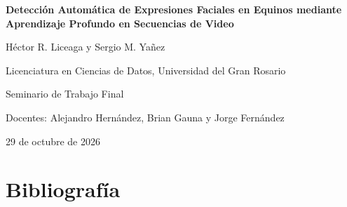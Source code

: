 \documentclass[12pt,a4paper,oneside]{report}
\begin{document}
\RaggedRight

\thispagestyle{fancy}
\begin{center}
  \vspace*{3cm}
  {\bfseries Detección Automática de Expresiones Faciales en Equinos mediante Aprendizaje Profundo en Secuencias de Video\par}
  \vspace{1.5cm}
  Héctor R. Liceaga y Sergio M. Yañez\par
  \vspace{1cm}
  Licenciatura en Ciencias de Datos, Universidad del Gran Rosario\par
  Seminario de Trabajo Final\par
  Docentes: Alejandro Hernández, Brian Gauna y Jorge Fernández\par
  29 de octubre de 2026\par
\end{center}
\clearpage


{\singlespacing\tableofcontents}
\clearpage







\clearpage
\chapter*{Bibliografía}
\begingroup
\setlength{\bibhang}{1.27cm}
\printbibliography[heading=none]
\endgroup


\end{document}
